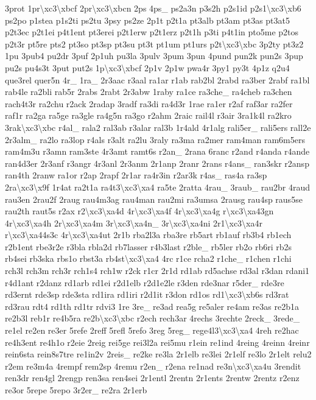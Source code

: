 \begin{DoxyCompactItemize}
3prot 1pr\textbackslash{}xc3\textbackslash{}xbcf 2pr\textbackslash{}xc3\textbackslash{}xbcn 2ps 4ps\-\_\- ps2a3n p3s2h p2s1id p2s1\textbackslash{}xc3\textbackslash{}xb6 ps2po p1stea p1s2ti ps2tu 3psy ps2ze 2p1t p2t1a pt3alb pt3am pt3as pt3at5 p2t3ec p2t1ei p4t1ent pt3erei p2t1erw p2t1erz p2t1h p3ti p4t1in pto5me p2tos p2t3r pt5re pts2 pt3so pt3sp pt3su pt3t pt1um pt1urs p2t\textbackslash{}xc3\textbackslash{}xbc 3p2ty pt3z2 1pu 3pub4 pu2dr 3puf 2p1uh pu3la 3pulv 3pum 3pun 4pund pun2k pun2s 3pup pu2s pu4s3t 3put put2s 1p\textbackslash{}xc3\textbackslash{}xbcf 2p1v 2p1w pwa4r 3py1 py3t 4p1z q2u4 que3rel quer5n 4r\-\_\- 1ra\-\_\- 2r3aac r3aal ra1ar r1ab rab2bl 2rabd ra3ber 2rabf ra1bl rab4le ra2bli rab5r 2rabs 2rabt 2r3abw 1raby ra1ce ra3che\-\_\- ra4cheb ra3chen rach4t3r ra2chu r2ack 2radap 3radf ra3di ra4d3r 1rae ra1er r2af raf3ar ra2fer raf1r ra2ga ra5ge ra3gle ra4g5n ra3go r2ahm 2raic rail4l r3air 3ra1k4l ra2kro 3rak\textbackslash{}xc3\textbackslash{}xbc r4al\-\_\- rala2 ral3ab r3alar ral3b 1r4ald 4r1alg rali5er\-\_\- rali5ers rall2e 2r3alm\-\_\- ra2lo ra3lop r4als r3alt ra2lu 3raly ra3ma ra2mer ram4man ram6m5ers ram4m3u r3amn ram3ste 4r3amt ramt6s r2an\-\_\- 2rana 6ranc r2and r4anda r4ande ran4d3er 2r3anf r3angr 4r3anl 2r3anm 2r1anp 2ranr 2rans r4ans\-\_\- ran3skr r2ansp ran4th 2ranw ra1or r2ap 2rapf 2r1ar ra4r3in r2ar3k r4as\-\_\- ras4a ra3sp 2ra\textbackslash{}xc3\textbackslash{}x9f 1r4at ra2t1a ra4t3\textbackslash{}xc3\textbackslash{}xa4 ra5te 2ratta 4rau\-\_\- 3raub\-\_\- rau2br 4raud rau3en 2rau2f 2raug rau4m3ag rau4man rau2mi ra3umsa 2rausg rau4sp raus5se rau2th raut5s r2ax r2\textbackslash{}xc3\textbackslash{}xa4d 4r\textbackslash{}xc3\textbackslash{}xa4f 4r\textbackslash{}xc3\textbackslash{}xa4g r\textbackslash{}xc3\textbackslash{}xa43gn 4r\textbackslash{}xc3\textbackslash{}xa4h 2r\textbackslash{}xc3\textbackslash{}xa4m 3r\textbackslash{}xc3\textbackslash{}xa4n\-\_\- 3r\textbackslash{}xc3\textbackslash{}xa4ni 2r1\textbackslash{}xc3\textbackslash{}xa4r r\textbackslash{}xc3\textbackslash{}xa44s3c 4r\textbackslash{}xc3\textbackslash{}xa4ut 2r1b rba2l3a rba3re rb5art rb1auf rb3b4 rb1ech r2b1ent rbe3r2e r3bla rbla2d rb7lasser r4b3last r2ble\-\_\- rb5ler rb2o rb6ri rb2s rb4sei rb3ska rbs1o rbst3a rb4st\textbackslash{}xc3\textbackslash{}xa4 4rc r1ce rcha2 r1che\-\_\- r1chen r1chi rch3l rch3m rch3r rch1s4 rch1w r2ck r1cr 2r1d rd1ab rd5achse rd3al r3dan rdani1 r4d1ant r2danz rd1arb rd1ei r2d1elb r2d1e2le r3den rde3nar r5der\-\_\- rde3re rd3ernt rde3sp rde3sta rd1ira rd1iri r2d1it r3don rd1os rd1\textbackslash{}xc3\textbackslash{}xb6s rd3rat rd3rau rdt4 rd1th rd1tr rdvi3 1re 3re\-\_\- re3ad rea5g re5aler re4am re3as re2b1a re2b3l reb1r re4b5ra re2b\textbackslash{}xc3\textbackslash{}xbc r2ech rech3ar 4rechs 3rechte 2reck\-\_\- 3rede\-\_\- re1el re2en re3er 5refe 2reff 5refl 5refo 3reg 5reg\-\_\- rege4l3\textbackslash{}xc3\textbackslash{}xa4 4reh re2hac re4h3ent re4h1o r2eie 2reig rei5ge rei3l2a rei5mu r1ein re1ind 4reing 4reinn 4reinr rein6sta rein8s7tre re1in2v 2reis\-\_\- re2ke re3la 2r1elb re3lei 2r1elf re3lo 2r1elt relu2 r2em re3m4a 4rempf rem2sp 4remu r2en\-\_\- r2ena re1nad re3n\textbackslash{}xc3\textbackslash{}xa4u 3rendit ren3dr ren4gl 2rengp ren3sa ren4sei 2r1entl 2rentn 2r1ents 2rentw 2rentz r2enz re3or 5repe 5repo 3r2er\-\_\- re2ra 2r1erb 
\end{DoxyCompactItemize}
